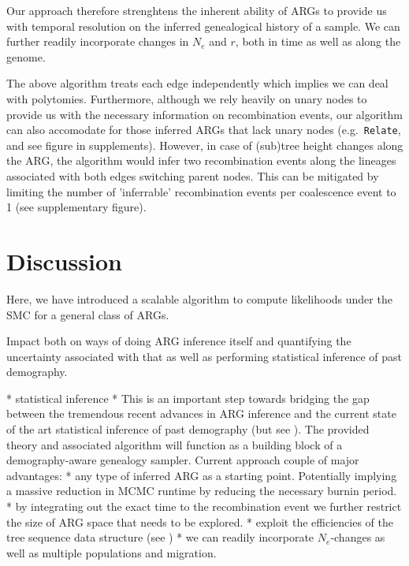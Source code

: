 \documentclass{article}
\newcommand{\relate}[0]{\texttt{Relate}}
\begin{document}
Our approach therefore strenghtens the inherent ability of ARGs to provide us with temporal 
resolution on the inferred genealogical history of a sample. 
We can further readily incorporate changes in $N_e$ and $r$, 
both in time as well as along the genome.

The above algorithm treats each edge independently which implies we can deal with polytomies.
Furthermore, although we rely heavily on unary nodes to provide us with the necessary 
information on recombination events, our algorithm can also accomodate for 
those inferred ARGs that lack unary nodes (e.g.\ \relate, and see figure in supplements).
However, in case of (sub)tree height changes along the ARG, the algorithm would infer 
two recombination events along the lineages associated 
with both edges switching parent nodes. This can be mitigated by limiting the number of 
'inferrable' recombination events per coalescence event to 1 (see supplementary figure). 


\section{Discussion}
Here, we have introduced a scalable algorithm to compute likelihoods 
under the SMC for a general class of ARGs. 



Impact both on ways of doing ARG inference itself and quantifying the uncertainty associated 
with that as well as performing statistical inference of past demography.

* statistical inference *
This is an important step towards bridging the gap between the tremendous 
recent advances in ARG inference and the current state of the art statistical inference of 
past demography (but see ). 
The provided theory and associated algorithm will function as a building block of a 
demography-aware genealogy sampler. Current approach couple of major advantages:
* any type of inferred ARG as a starting point. Potentially implying a massive reduction in 
MCMC runtime by reducing the necessary burnin period.
* by integrating out the exact time to the recombination event we further restrict the size 
of ARG space that needs to be explored.
* exploit the efficiencies of the tree sequence data structure (see \citep{Mahmoudi_bayesian_2022})
* we can readily incorporate $N_e$-changes as well as multiple populations and migration.
\end{document}
